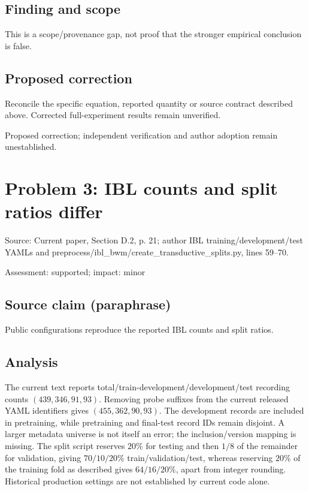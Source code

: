 \documentclass[11pt]{article}
\begin{document}
\subsection*{Finding and scope}

This is a scope/provenance gap, not proof that the stronger empirical conclusion is false.

\subsection*{Proposed correction}

Reconcile the specific equation, reported quantity or source contract described above. Corrected full-experiment results remain unverified.

Proposed correction; independent verification and author adoption remain unestablished.

\section*{Problem 3: IBL counts and split ratios differ}

Source: Current paper, Section D.2, p. 21; author IBL training/development/test YAMLs and preprocess/ibl\_bwm/create\_transductive\_splits.py, lines 59–70.

Assessment: supported; impact: minor

\subsection*{Source claim (paraphrase)}

Public configurations reproduce the reported IBL counts and split ratios.

\subsection*{Analysis}

The current text reports total/train-development/development/test recording counts \((439,346,91,93)\). Removing probe suffixes from the current released YAML identifiers gives \((455,362,90,93)\). The development records are included in pretraining, while pretraining and final-test record IDs remain disjoint. A larger metadata universe is not itself an error; the inclusion/version mapping is missing. The split script reserves \(20\%\) for testing and then \(1/8\) of the remainder for validation, giving \(70/10/20\%\) train/validation/test, whereas reserving \(20\%\) of the training fold as described gives \(64/16/20\%\), apart from integer rounding. Historical production settings are not established by current code alone.
\end{document}
